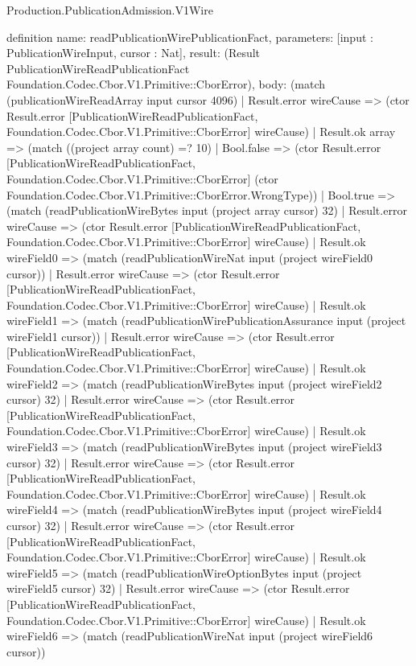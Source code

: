 \begin{lexlean}{Production.PublicationAdmission.V1Wire}
\begin{semanticmodule}
definition{
  name: readPublicationWirePublicationFact,
  parameters: [input : PublicationWireInput, cursor : Nat],
  result: (Result PublicationWireReadPublicationFact Foundation.Codec.Cbor.V1.Primitive::CborError),
  body: (match (publicationWireReadArray input cursor 4096)
    | Result.error wireCause => (ctor Result.error [PublicationWireReadPublicationFact, Foundation.Codec.Cbor.V1.Primitive::CborError] wireCause)
    | Result.ok array => (match ((project array count) =? 10)
      | Bool.false => (ctor Result.error [PublicationWireReadPublicationFact, Foundation.Codec.Cbor.V1.Primitive::CborError] (ctor Foundation.Codec.Cbor.V1.Primitive::CborError.WrongType))
      | Bool.true => (match (readPublicationWireBytes input (project array cursor) 32)
        | Result.error wireCause => (ctor Result.error [PublicationWireReadPublicationFact, Foundation.Codec.Cbor.V1.Primitive::CborError] wireCause)
        | Result.ok wireField0 => (match (readPublicationWireNat input (project wireField0 cursor))
          | Result.error wireCause => (ctor Result.error [PublicationWireReadPublicationFact, Foundation.Codec.Cbor.V1.Primitive::CborError] wireCause)
          | Result.ok wireField1 => (match (readPublicationWirePublicationAssurance input (project wireField1 cursor))
            | Result.error wireCause => (ctor Result.error [PublicationWireReadPublicationFact, Foundation.Codec.Cbor.V1.Primitive::CborError] wireCause)
            | Result.ok wireField2 => (match (readPublicationWireBytes input (project wireField2 cursor) 32)
              | Result.error wireCause => (ctor Result.error [PublicationWireReadPublicationFact, Foundation.Codec.Cbor.V1.Primitive::CborError] wireCause)
              | Result.ok wireField3 => (match (readPublicationWireBytes input (project wireField3 cursor) 32)
                | Result.error wireCause => (ctor Result.error [PublicationWireReadPublicationFact, Foundation.Codec.Cbor.V1.Primitive::CborError] wireCause)
                | Result.ok wireField4 => (match (readPublicationWireBytes input (project wireField4 cursor) 32)
                  | Result.error wireCause => (ctor Result.error [PublicationWireReadPublicationFact, Foundation.Codec.Cbor.V1.Primitive::CborError] wireCause)
                  | Result.ok wireField5 => (match (readPublicationWireOptionBytes input (project wireField5 cursor) 32)
                    | Result.error wireCause => (ctor Result.error [PublicationWireReadPublicationFact, Foundation.Codec.Cbor.V1.Primitive::CborError] wireCause)
                    | Result.ok wireField6 => (match (readPublicationWireNat input (project wireField6 cursor))
}
\end{semanticmodule}
\end{lexlean}
